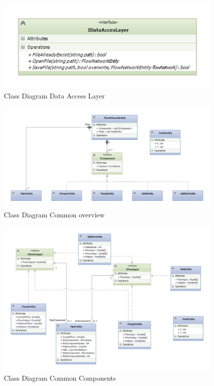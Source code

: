 \begin{figure}[h!]
	\centering
	\includegraphics{figures/ClassDataAccess.pdf}
	\caption{Class Diagram Data Access Layer}
	\label{fig:dataaccess}
\end{figure}

\begin{figure}
	\centering
	\includegraphics[width=\textwidth]{figures/ClassCommonOverall.pdf}
	\caption{Class Diagram Common overview}
	\label{fig:commonoverview}
\end{figure}

\begin{figure}
	\centering
	\includegraphics[width=\textwidth]{figures/ClassCommonComponents.pdf}
	\caption{Class Diagram Common Components}
	\label{fig:classcomponents}
\end{figure}

